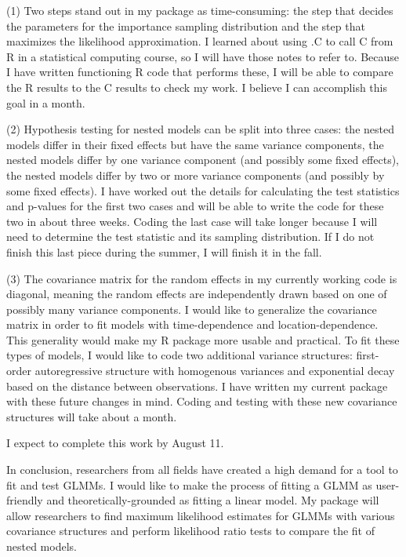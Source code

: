 \documentclass[12pt]{article}
\begin{document}
(1) Two steps stand out in my package as time-consuming: the step that decides the parameters for the importance sampling distribution and the step that maximizes the likelihood approximation. I learned about using .C to call C from R in a statistical computing course, so I will have those notes to refer to. Because I have written functioning R code that performs these, I will be able to compare the R results to the C results to check my work.  I believe I can accomplish this goal in a month.

(2)  Hypothesis testing for nested models can be split into three cases: the nested models differ in their fixed effects but have the same variance components, the nested models differ by one variance component (and possibly some fixed effects), the nested models differ by two or more variance components (and possibly by some fixed effects). I have worked out the details for calculating the test statistics and p-values for the first two cases and will  be able to write the code for these two in about three weeks.  Coding the last case will take longer because I will need to determine the test statistic and its sampling distribution.  If I do not finish this last piece during the summer, I will finish it in the fall.  

(3) The covariance matrix for the random effects in my currently working code is diagonal, meaning the random effects are independently drawn based on one of possibly many variance components.  I would like to generalize the covariance matrix in order to fit models with time-dependence and location-dependence.  This generality would make my R package more usable and practical.  To fit these types of models, I would like to code two additional variance structures:  first-order autoregressive structure with homogenous variances and exponential decay based on the distance between observations.  I have written my current package with these future changes in mind. Coding and testing with these new covariance structures will take about a month.

I expect to complete this work by August 11.


In conclusion, researchers from all fields have created a high demand for a tool to fit and test GLMMs. I would like to make the process of fitting a GLMM as user-friendly and theoretically-grounded as fitting a linear model. My package will allow researchers to find maximum likelihood estimates for GLMMs with various covariance structures and perform likelihood ratio tests to compare the fit of nested models.

\vspace{-2.3cm}
\renewcommand{\refname}{}


\end{document}
